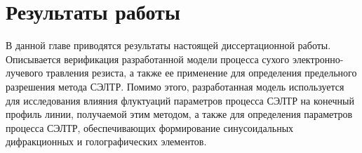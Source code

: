 \chapter{Результаты работы}

В данной главе приводятся результаты настоящей диссертационной работы. Описывается верификация разработанной модели процесса сухого электронно-лучевого травления резиста, а также ее применение для определения предельного разрешения метода СЭЛТР. Помимо этого, разработанная модель используется для исследования влияния флуктуаций параметров процесса СЭЛТР на конечный профиль линии, получаемой этим методом, а также для определения параметров процесса СЭЛТР, обеспечивающих формирование синусоидальных дифракционных и голографических элементов.








